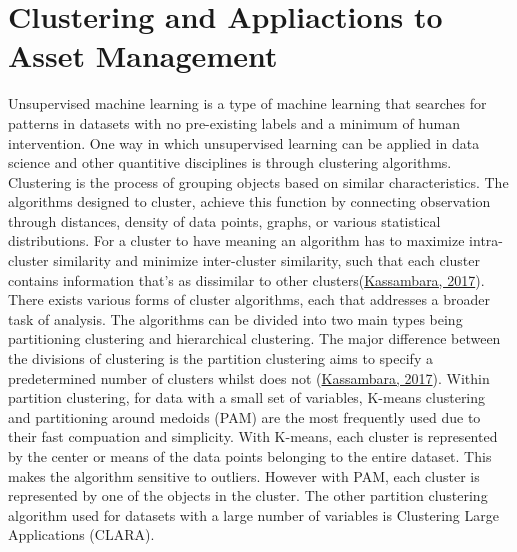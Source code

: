 \documentclass[11pt,preprint, authoryear]{elsarticle}
\numberwithin{equation}{section}
\numberwithin{figure}{section}
\numberwithin{table}{section}
\begin{document}
\hypertarget{clustering-and-appliactions-to-asset-management}{%
\section{Clustering and Appliactions to Asset
Management}\label{clustering-and-appliactions-to-asset-management}}

Unsupervised machine learning is a type of machine learning that
searches for patterns in datasets with no pre-existing labels and a
minimum of human intervention. One way in which unsupervised learning
can be applied in data science and other quantitive disciplines is
through clustering algorithms. Clustering is the process of grouping
objects based on similar characteristics. The algorithms designed to
cluster, achieve this function by connecting observation through
distances, density of data points, graphs, or various statistical
distributions. For a cluster to have meaning an algorithm has to
maximize intra-cluster similarity and minimize inter-cluster similarity,
such that each cluster contains information that's as dissimilar to
other
clusters(\protect\hyperlink{ref-kassambara2017practical}{Kassambara,
2017}). There exists various forms of cluster algorithms, each that
addresses a broader task of analysis. The algorithms can be divided into
two main types being partitioning clustering and hierarchical
clustering. The major difference between the divisions of clustering is
the partition clustering aims to specify a predetermined number of
clusters whilst does not
(\protect\hyperlink{ref-kassambara2017practical}{Kassambara, 2017}).
Within partition clustering, for data with a small set of variables,
K-means clustering and partitioning around medoids (PAM) are the most
frequently used due to their fast compuation and simplicity. With
K-means, each cluster is represented by the center or means of the data
points belonging to the entire dataset. This makes the algorithm
sensitive to outliers. However with PAM, each cluster is represented by
one of the objects in the cluster. The other partition clustering
algorithm used for datasets with a large number of variables is
Clustering Large Applications (CLARA).
\end{document}
